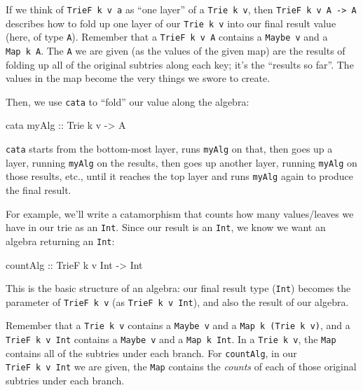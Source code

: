 \documentclass[]{article}
\newenvironment{Shaded}{}{}
\newcommand{\DataTypeTok}[1]{\textcolor[rgb]{0.56,0.13,0.00}{#1}}
\newcommand{\NormalTok}[1]{#1}
\newcommand{\OtherTok}[1]{\textcolor[rgb]{0.00,0.44,0.13}{#1}}
\begin{document}
If we think of \texttt{TrieF\ k\ v\ a} as ``one layer'' of a
\texttt{Trie\ k\ v}, then \texttt{TrieF\ k\ v\ A\ -\textgreater{}\ A} describes
how to fold up one layer of our \texttt{Trie\ k\ v} into our final result value
(here, of type \texttt{A}). Remember that a \texttt{TrieF\ k\ v\ A} contains a
\texttt{Maybe\ v} and a \texttt{Map\ k\ A}. The \texttt{A} we are given (as the
values of the given map) are the results of folding up all of the original
subtries along each key; it's the ``results so far''. The values in the map
become the very things we swore to create.

Then, we use \texttt{cata} to ``fold'' our value along the algebra:

\begin{Shaded}
\begin{Highlighting}[]
\NormalTok{cata}\OtherTok{ myAlg ::} \DataTypeTok{Trie}\NormalTok{ k v }\OtherTok{{-}\textgreater{}} \DataTypeTok{A}
\end{Highlighting}
\end{Shaded}

\texttt{cata} starts from the bottom-most layer, runs \texttt{myAlg} on that,
then goes up a layer, running \texttt{myAlg} on the results, then goes up
another layer, running \texttt{myAlg} on those results, etc., until it reaches
the top layer and runs \texttt{myAlg} again to produce the final result.

For example, we'll write a catamorphism that counts how many values/leaves we
have in our trie as an \texttt{Int}. Since our result is an \texttt{Int}, we
know we want an algebra returning an \texttt{Int}:

\begin{Shaded}
\begin{Highlighting}[]
\OtherTok{countAlg ::} \DataTypeTok{TrieF}\NormalTok{ k v }\DataTypeTok{Int} \OtherTok{{-}\textgreater{}} \DataTypeTok{Int}
\end{Highlighting}
\end{Shaded}

This is the basic structure of an algebra: our final result type (\texttt{Int})
becomes the parameter of \texttt{TrieF\ k\ v} (as \texttt{TrieF\ k\ v\ Int}),
and also the result of our algebra.

Remember that a \texttt{Trie\ k\ v} contains a \texttt{Maybe\ v} and a
\texttt{Map\ k\ (Trie\ k\ v)}, and a \texttt{TrieF\ k\ v\ Int} contains a
\texttt{Maybe\ v} and a \texttt{Map\ k\ Int}. In a \texttt{Trie\ k\ v}, the
\texttt{Map} contains all of the subtries under each branch. For
\texttt{countAlg}, in our \texttt{TrieF\ k\ v\ Int} we are given, the
\texttt{Map} contains the \emph{counts} of each of those original subtries under
each branch.
\end{document}
